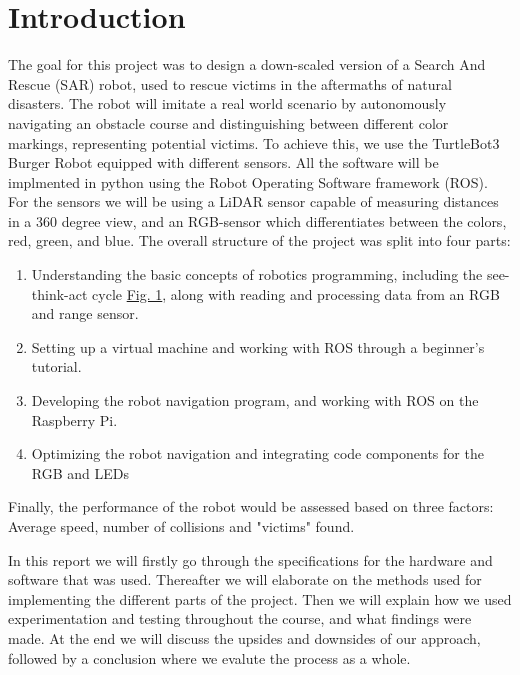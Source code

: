\documentclass[conference]{IEEEtran}
\begin{document}
\section{Introduction}
The goal for this project was to design a down-scaled version of a Search And Rescue (SAR) robot, used to rescue victims in the aftermaths of natural disasters.
The robot will imitate a real world scenario by autonomously navigating an obstacle course and distinguishing between different color markings, representing potential victims. To achieve this, we use the TurtleBot3 Burger Robot equipped with different sensors.
All the software will be implmented in python using the Robot Operating Software framework (ROS). For the sensors we will be using a LiDAR sensor capable of measuring distances in a 360 degree view, and an RGB-sensor which differentiates between the colors, red, green, and blue. 
The overall structure of the project was split into four parts:
\begin{enumerate}
    \item Understanding the basic concepts of robotics programming, including the see-think-act cycle \href{sec:STAC}{Fig. 1}, along with reading and processing data from an RGB and range sensor.
    \item Setting up a virtual machine and working with ROS through a beginner's tutorial.
    \item Developing the robot navigation program, and working with ROS on the Raspberry Pi.
    \item Optimizing the robot navigation and integrating code components for the RGB and LEDs
\end{enumerate} 
Finally, the performance of the robot would be assessed based on three factors: Average speed, number of collisions and "victims" found.

In this report we will firstly go through the specifications for the hardware and software that was used.
Thereafter we will elaborate on the methods used for implementing the different parts of the project.
Then we will explain how we used experimentation and testing throughout the course, and what findings were made.
At the end we will discuss the upsides and downsides of our approach, followed by a conclusion where we evalute the process as a whole.
\end{document}
